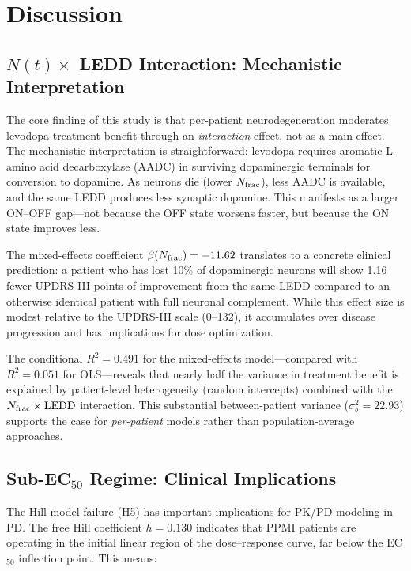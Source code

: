 \section{Discussion}

\subsection{$N(t) \times$ LEDD Interaction: Mechanistic Interpretation}

The core finding of this study is that per-patient neurodegeneration
moderates levodopa treatment benefit through an \textit{interaction}
effect, not as a main effect. The mechanistic interpretation is
straightforward: levodopa requires aromatic L-amino acid decarboxylase
(AADC) in surviving dopaminergic terminals for conversion to dopamine.
As neurons die (lower $N_{\mathrm{frac}}$), less AADC is available, and the same
LEDD produces less synaptic dopamine. This manifests as a larger ON--OFF
gap---not because the OFF state worsens faster, but because the ON state
improves less.

The mixed-effects coefficient $\beta(N_{\mathrm{frac}}) = -11.62$ translates to a
concrete clinical prediction: a patient who has lost 10\% of dopaminergic
neurons will show 1.16 fewer UPDRS-III points of improvement from the same
LEDD compared to an otherwise identical patient with full neuronal
complement. While this effect size is modest relative to the UPDRS-III
scale (0--132), it accumulates over disease progression and has
implications for dose optimization.

The conditional $R^2 = 0.491$ for the mixed-effects model---compared with
$R^2 = 0.051$ for OLS---reveals that nearly half the variance in treatment
benefit is explained by patient-level heterogeneity (random intercepts)
combined with the $N_{\mathrm{frac}} \times \mathrm{LEDD}$ interaction. This substantial
between-patient variance ($\sigma^2_b = 22.93$) supports the case for
\textit{per-patient} models rather than population-average approaches.


\subsection{Sub-EC$_{50}$ Regime: Clinical Implications}

The Hill model failure (H5) has important implications for PK/PD modeling
in PD. The free Hill coefficient $h = 0.130$ indicates that PPMI patients
are operating in the initial linear region of the dose--response curve,
far below the EC$_{50}$ inflection point. This means:

